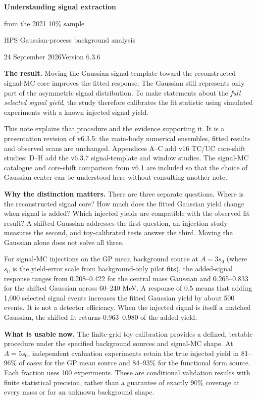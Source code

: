\documentclass[11pt]{article}
\begin{document}
{\LARGE\bfseries Understanding signal extraction\par from the 2021 10\% sample}\par
{\large HPS Gaussian-process background analysis}\par
24 September 2026\hfill Version 6.3.6

\textbf{The result.} Moving the Gaussian signal template toward the reconstructed signal-MC core improves the fitted response. The Gaussian still represents only part of the asymmetric signal distribution. To make statements about the \emph{full selected signal yield}, the study therefore calibrates the fit statistic using simulated experiments with a known injected signal yield.

This note explains that procedure and the evidence supporting it. It is a presentation revision of v6.3.5: the main-body numerical ensembles, fitted results and observed scans are unchanged. Appendices A--C add v16 TC/UC core-shift studies; D--H add the v6.3.7 signal-template and window studies. The signal-MC catalogue and core-shift comparison from v6.1 are included so that the choice of Gaussian center can be understood here without consulting another note.

\textbf{Why the distinction matters.} There are three separate questions. Where is the reconstructed signal core? How much does the fitted Gaussian yield change when signal is added? Which injected yields are compatible with the observed fit result? A shifted Gaussian addresses the first question, an injection study measures the second, and toy-calibrated tests answer the third. Moving the Gaussian alone does not solve all three.

For signal-MC injections on the GP mean background source at $A=3s_0$ (where $s_0$ is the yield-error scale from background-only pilot fits), the added-signal response ranges from 0.208--0.422 for the central mass Gaussian and 0.265--0.833 for the shifted Gaussian across 60--240 MeV. A response of 0.5 means that adding 1,000 selected signal events increases the fitted Gaussian yield by about 500 events. It is not a detector efficiency. When the injected signal is itself a matched Gaussian, the shifted fit returns 0.963--0.980 of the added yield.

\textbf{What is usable now.} The finite-grid toy calibration provides a defined, testable procedure under the specified background sources and signal-MC shape. At $A=5s_0$, independent evaluation experiments retain the true injected yield in 81--96\% of cases for the GP mean source and 84--93\% for the functional form source. Each fraction uses 100 experiments. These are conditional validation results with finite statistical precision, rather than a guarantee of exactly 90\% coverage at every mass or for an unknown background shape.
\end{document}
